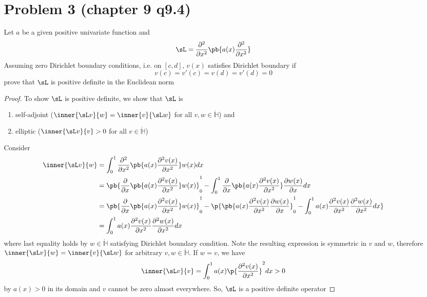 \documentclass[11pt]{article}
\begin{document}
\newpage
\section*{Problem 3 (chapter 9 q9.4)}
Let $a$ be a given positive univariate function and 
\[
    \sL = \frac{\partial^2}{\partial x^2} \pb{
        a(x) \frac{\partial^2}{\partial x^2}
    }
\]
Assuming zero Dirichlet boundary conditions, i.e. on $[c,d]$, $v(x)$ satisfies Dirichlet boundary if
\[
    v(c) = v'(c) = v(d) = v'(d) = 0
\]
prove that $\sL$ is positive definite in the Euclidean norm
\begin{proof}
    To show $\sL$ is positive definite, we show that $\sL$ is
    \begin{enumerate}
        \item self-adjoint ($\inner{\sL v}{w} = \inner{v}{\sL w}$ for all $v,w\in \mathring{\mathbb{H}}$) and
        \item elliptic ($\inner{\sL v}{v} > 0$ for all $v\in \mathring{\mathbb{H}}$)
    \end{enumerate} 
    Consider 
    \begin{align*}
        \inner{\sL v}{w}
        &= \int_0^1 \frac{\partial^2}{\partial x^2} \pb{
            a(x) \frac{\partial^2 v(x)}{\partial x^2}
        } w(x) dx \\
        &= \pb{
            \frac{\partial}{\partial x} \pb{
                a(x) \frac{\partial^2 v(x)}{\partial x^2}
            } w(x)
        }_0^1 - \int_0^1 \frac{\partial}{\partial x} \pb{
            a(x) \frac{\partial^2 v(x)}{\partial x^2}
        } \frac{\partial w(x)}{\partial x} dx \\
        &= \pb{
            \frac{\partial}{\partial x} \pb{
                a(x) \frac{\partial^2 v(x)}{\partial x^2}
            } w(x)
        }_0^1 - \p{
            \pb{
                a(x) \frac{\partial^2 v(x)}{\partial x^2} \frac{\partial w(x)}{\partial x}
            }_0^1
            -
            \int_0^1 a(x) \frac{\partial^2 v(x)}{\partial x^2} \frac{\partial^2 w(x)}{\partial x^2} dx
        } \\
        &= \int_0^1 a(x) \frac{\partial^2 v(x)}{\partial x^2} \frac{\partial^2 w(x)}{\partial x^2} dx
    \end{align*}
    where last equality holds by $w\in \mathring{\mathbb{H}}$ satisfying Dirichlet boundary condition. Note the resulting expression is symmetric in $v$ and $w$, therefore $\inner{\sL v}{w} = \inner{v}{\sL w}$ for arbitrary $v,w\in \mathring{\mathbb{H}}$. If $w=v$, we have 
    \[
        \inner{\sL v}{v} =     \int_0^1 a(x) \p{\frac{\partial^2 v(x)}{\partial x^2}}^2 dx > 0
    \]
    by $a(x) > 0$ in its domain and $v$ cannot be zero almost everywhere. So, $\sL$ is a positive definite operator
\end{proof}
\end{document}
